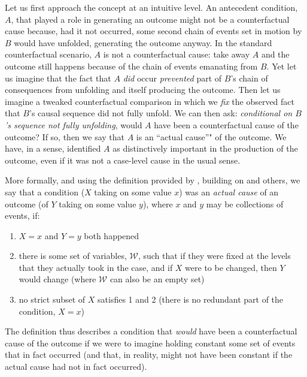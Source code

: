 \documentclass[12pt,]{book}
\providecommand{\tightlist}{%
  \setlength{\itemsep}{0pt}\setlength{\parskip}{0pt}}
\begin{document}
Let us first approach the concept at an intuitive level. An antecedent condition, \(A\), that played a role in generating an outcome might not be a counterfactual cause because, had it not occurred, some second chain of events set in motion by \(B\) would have unfolded, generating the outcome anyway. In the standard counterfactual scenario, \(A\) is not a counterfactual cause: take away \(A\) and the outcome still happens because of the chain of events emanating from \(B\). Yet let us imagine that the fact that \(A\) \emph{did} occur \emph{prevented} part of \(B\)'s chain of consequences from unfolding and itself producing the outcome. Then let us imagine a tweaked counterfactual comparison in which we \emph{fix} the observed fact that \(B\)'s causal sequence did not fully unfold. We can then ask: \emph{conditional on \(B\)'s sequence not fully unfolding}, would \(A\) have been a counterfactual cause of the outcome? If so, then we say that \(A\) is an ``actual cause''" of the outcome. We have, in a sense, identified \(A\) as distinctively important in the production of the outcome, even if it was not a case-level cause in the usual sense.

More formally, and using the definition provided by \citep{halpern2015modification}, building on \citep{halpern2005causesa} and others, we say that a condition (\(X\) taking on some value \(x\)) was an \emph{actual cause} of an outcome (of \(Y\) taking on some value \(y\)), where \(x\) and \(y\) may be collections of events, if:

\begin{enumerate}
\def\labelenumi{\arabic{enumi}.}
\tightlist
\item
  \(X=x\) and \(Y=y\) both happened
\item
  there is some set of variables, \(\mathcal W\), such that if they were fixed at the levels that they actually took in the case, and if \(X\) were to be changed, then \(Y\) would change (where \(\mathcal W\) can also be an empty set)
\item
  no strict subset of \(X\) satisfies 1 and 2 (there is no redundant part of the condition, \(X=x\))
\end{enumerate}

The definition thus describes a condition that \emph{would} have been a counterfactual cause of the outcome if we were to imagine holding constant some set of events that in fact occurred (and that, in reality, might not have been constant if the actual cause had not in fact occurred).
\end{document}

